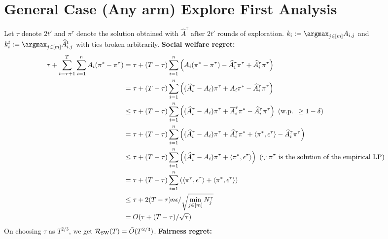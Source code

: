 \iffalse

\section{General Case (Any arm) Explore First Analysis}
Let $\tau$ denote $2t'$ and $\pi^{\tau}$ denote the solution obtained with $\hat{A}^{\tau}$ after $2t'$ rounds of exploration. $k_i:=\argmax_{j\in [m]}A_{i, j}$ and $k_i^t:=\argmax_{j\in [m]}\widehat{A}^t_{i, j}$ with ties broken arbitrarily.
\newline
\textbf{Social welfare regret:}
\begin{align*}
    \tau + \sum_{t=\tau+1}^T\sum_{i=1}^n A_i(\pi^*-\pi^\tau) & = \tau + (T-\tau)\sum_{i=1}^n \left(A_i(\pi^*-\pi^\tau) - \widehat{A}_i^\tau \pi^\tau + \widehat{A}_i^\tau \pi^\tau \right)\\
    & = \tau + (T-\tau)\sum_{i=1}^n \left( (\widehat{A}^\tau_i-A_i)\pi^\tau + A_i\pi^* - \widehat{A}_i^\tau \pi^\tau \right)\\
    & \leq  \tau + (T-\tau)\sum_{i=1}^n \left( (\widehat{A}^\tau_i-A_i)\pi^\tau + \overline{A}^\tau_i\pi^* - \widehat{A}_i^\tau \pi^\tau \right) \ (\textup{w.p. }\geq 1-\delta)\\
    & = \tau + (T-\tau)\sum_{i=1}^n \left( (\widehat{A}^\tau_i-A_i)\pi^\tau + \widehat{A}^\tau_i\pi^* + \langle \pi^*,\epsilon^\tau \rangle - \widehat{A}_i^\tau \pi^\tau \right)\\
    & \leq  \tau + (T-\tau)\sum_{i=1}^n \left( (\widehat{A}^\tau_i-A_i)\pi^\tau + \langle \pi^*,\epsilon^\tau \rangle \right) \ (\because \pi^\tau \ \textup{is the solution of the empirical LP})\\
    &= \tau + (T-\tau)\sum_{i=1}^n \left( \langle \pi^\tau, \epsilon^\tau \rangle + \langle \pi^*,\epsilon^\tau \rangle \right)\\
    &\leq  \tau + 2(T-\tau)n \epsilon/\sqrt{\min_{j\in [m]} N_j^\tau}\\
    & =  O(\tau + (T-\tau)/\sqrt{\tau})
\end{align*}
On choosing $\tau$ as $T^{2/3}$, we get $\mathcal{R}_\textsc{SW}(T)=\tilde{O}(T^{2/3})$.
\newline
\newline
\textbf{Fairness regret:}
